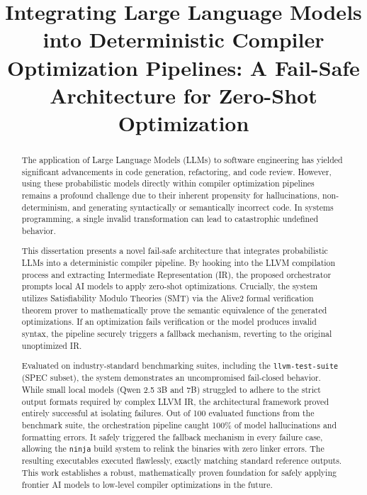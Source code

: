 \documentclass[conference,10pt]{IEEEtran}
\begin{document}
\title{Integrating Large Language Models into Deterministic Compiler Optimization Pipelines: A Fail-Safe Architecture for Zero-Shot Optimization\\}

\author{
}

\maketitle

\begin{abstract}
The application of Large Language Models (LLMs) to software engineering has yielded significant advancements in code generation, refactoring, and code review. However, using these probabilistic models directly within compiler optimization pipelines remains a profound challenge due to their inherent propensity for hallucinations, non-determinism, and generating syntactically or semantically incorrect code. In systems programming, a single invalid transformation can lead to catastrophic undefined behavior. 

This dissertation presents a novel fail-safe architecture that integrates probabilistic LLMs into a deterministic compiler pipeline. By hooking into the LLVM compilation process and extracting Intermediate Representation (IR), the proposed orchestrator prompts local AI models to apply zero-shot optimizations. Crucially, the system utilizes Satisfiability Modulo Theories (SMT) via the Alive2 formal verification theorem prover to mathematically prove the semantic equivalence of the generated optimizations. If an optimization fails verification or the model produces invalid syntax, the pipeline securely triggers a fallback mechanism, reverting to the original unoptimized IR.

Evaluated on industry-standard benchmarking suites, including the \texttt{llvm-test-suite} (SPEC subset), the system demonstrates an uncompromised fail-closed behavior. While small local models (Qwen 2.5 3B and 7B) struggled to adhere to the strict output formats required by complex LLVM IR, the architectural framework proved entirely successful at isolating failures. Out of 100 evaluated functions from the benchmark suite, the orchestration pipeline caught 100\% of model hallucinations and formatting errors. It safely triggered the fallback mechanism in every failure case, allowing the \texttt{ninja} build system to relink the binaries with zero linker errors. The resulting executables executed flawlessly, exactly matching standard reference outputs. This work establishes a robust, mathematically proven foundation for safely applying frontier AI models to low-level compiler optimizations in the future.
\end{abstract}
\end{document}
